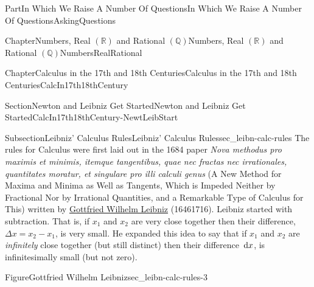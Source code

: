 \documentclass[oneside,10pt,]{book}
\numberwithin{equation}{part}
\newcommand{\dx}[1]{\,{\rm d}#1}
\newcommand{\RR}{\mathbb {R}}
\newcommand{\QQ}{\mathbb {Q}}
\begin{document}
\begin{partptx}{Part}{In Which We Raise A Number Of Questions}{}{In Which We Raise A Number Of Questions}{}{}{AskingQuestions}
\begin{chapterptx}{Chapter}{Numbers, Real \(\left(\RR\right)\) and Rational \(\left(\QQ\right)\)}{}{Numbers, Real \(\left(\RR\right)\) and Rational \(\left(\QQ\right)\)}{}{}{NumbersRealRational}
\end{chapterptx}
%
%
\typeout{************************************************}
\typeout{************************************************}
%
\begin{chapterptx}{Chapter}{Calculus in the 17th and 18th Centuries}{}{Calculus in the 17th and 18th Centuries}{}{}{CalcIn17th18thCentury}
\renewcommand*{\chaptername}{Chapter}
%
%
\typeout{************************************************}
\typeout{************************************************}
%
\begin{sectionptx}{Section}{Newton and Leibniz Get Started}{}{Newton and Leibniz Get Started}{}{}{CalcIn17th18thCentury-NewtLeibStart}
%
%
\typeout{************************************************}
\typeout{************************************************}
%
\begin{subsectionptx}{Subsection}{Leibniz' Calculus Rules}{}{Leibniz' Calculus Rules}{}{}{sec_leibn-calc-rules}
 The rules for Calculus were first laid out in the 1684 paper \textit{Nova methodus pro maximis et minimis, itemque tangentibus, quae nec fractas nec irrationales, quantitates moratur, et singulare pro illi calculi genus} (A New Method for Maxima and Minima as Well as Tangents, Which is Impeded Neither by Fractional Nor by Irrational Quantities, and a Remarkable Type of Calculus for This) written by \href{https://mathshistory.st-andrews.ac.uk/Biographies/Leibniz/}{Gottfried Wilhelm Leibniz} (1646\textendash{}1716).  Leibniz started with subtraction.  That is, if \(x_1\) and \(x_2\) are very close together then their difference, \(\Delta
x=x_2-x_1\), is very small.  He expanded this idea to say that if \(x_1\) and \(x_2\) are \emph{infinitely} close together (but still distinct) then their difference \(\dx{ x}\), is infinitesimally small (but not zero).%
\begin{figureptx}{Figure}{Gottfried Wilhelm Leibniz}{sec_leibn-calc-rules-3}{}%
%
%
\begin{image}{0.325}{0.35}{0.325}{}%

\end{image}
\end{figureptx}
\end{subsectionptx}
\end{sectionptx}
\end{chapterptx}
\end{partptx}
\end{document}
